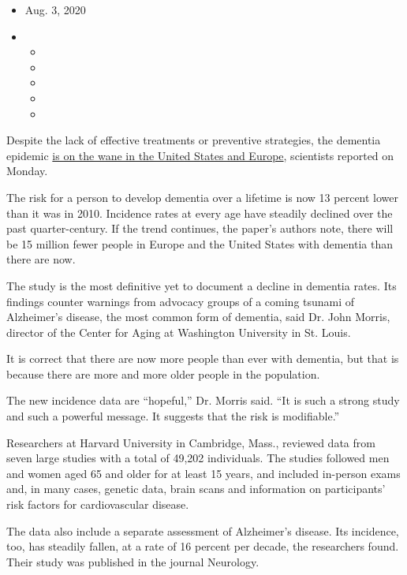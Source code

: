 \begin{itemize}
\item
  Aug. 3, 2020
\item
  \begin{itemize}
  \item
  \item
  \item
  \item
  \item
  \end{itemize}
\end{itemize}

Despite the lack of effective treatments or preventive strategies, the
dementia epidemic
\href{https://n.neurology.org/content/early/2020/07/01/WNL.0000000000010022}{is
on the wane in the United States and Europe}, scientists reported on
Monday.

The risk for a person to develop dementia over a lifetime is now 13
percent lower than it was in 2010. Incidence rates at every age have
steadily declined over the past quarter-century. If the trend continues,
the paper's authors note, there will be 15 million fewer people in
Europe and the United States with dementia than there are now.

The study is the most definitive yet to document a decline in dementia
rates. Its findings counter warnings from advocacy groups of a coming
tsunami of Alzheimer's disease, the most common form of dementia, said
Dr. John Morris, director of the Center for Aging at Washington
University in St. Louis.

It is correct that there are now more people than ever with dementia,
but that is because there are more and more older people in the
population.

The new incidence data are ``hopeful,'' Dr. Morris said. ``It is such a
strong study and such a powerful message. It suggests that the risk is
modifiable.''

Researchers at Harvard University in Cambridge, Mass., reviewed data
from seven large studies with a total of 49,202 individuals. The studies
followed men and women aged 65 and older for at least 15 years, and
included in-person exams and, in many cases, genetic data, brain scans
and information on participants' risk factors for cardiovascular
disease.

The data also include a separate assessment of Alzheimer's disease. Its
incidence, too, has steadily fallen, at a rate of 16 percent per decade,
the researchers found. Their study was published in the journal
Neurology.

